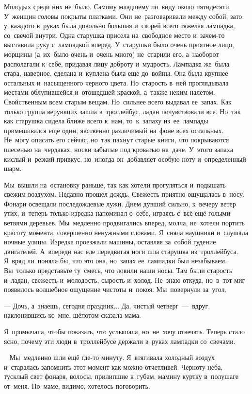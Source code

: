 Молодых среди них не~было.
Самому младшему по~виду около пятидесяти.
У~женщин головы покрыты платками.
Они не~разговаривали между собой, зато у~каждого в~руках была довольно большая и~скорей всего тяжелая лампадка, со~свечой внутри.
Одна старушка присела на~свободное место и~зачем-то выставила руку с~лампадкой вперед.
У~старушки было очень приятное лицо, морщины (а~их~было очень и~очень много) не~старили его, а~наоборот располагали к~себе, придавая лицу доброту и~мудрость.
Лампадка же~была стара, наверное, сделана и~куплена была еще до~войны.
Она была крупнее остальных и~насыщенного черного цвета.
Но~старость в~ней проглядывала местами облупившейся и~отошедшей краской, а~также неким налетом.
Свойственным всем старым вещам.
Но~сильнее всего выдавал ее~запах.
Как только группа верующих зашла в~троллейбус, ладан почувствовали все.
Но~так как старушка сидела ближе всего к~нам, то~к~запаху из~ее~лампады примешивался еще один, явственно различимый на~фоне всех остальных.
Не~могу описать его сейчас, но~так пахнут старые книги, что покрываются плесенью на~чердаках, носки забытые под кроватью на~даче.
У~этого запаха кислый и~резкий привкус, но~иногда он~добавляет особую ноту и~определенный шарм.


Мы~вышли на~остановку раньше, так как хотели прогуляться и~подышать свежим воздухом.
Недавно прошел дождь.
Свежесть приятно ощущалась в~носу.
Фонари освещали последождевые лужи.
Днем дувший сильно, к~вечеру ветер утих, и~теперь только изредка напоминал о~себе, играясь с~всё ещё голыми ветвями деревьев.
Мы~медленно продвигались вперед, молча, не~хотели портить красоту момента, совершенно ненужными словами.
Я~сняла наушники и~слушала ночные улицы.
Изредка проезжали машины, оставляя за~собой гудение двигателей.
А~впереди нас еле передвигая ноги шла старушка из~троллейбуса.
Я~вряд ли~поняла бы, что это она, но~запах ее~лампадки был незабываем.
Вы~только представьте ту~смесь, что ловили наши носы.
Там были старость и~ладан, свежесть и~молодость, сырость и~холод.
Не~знаю откуда, но~в~тот миг появилось волшебное ощущение чистоты и~покоя.
Мы~повернули за~угол.

 --- Дочь, а~знаешь, сегодня праздник... Да, чистый четверг~---~вдруг, наклонившись ко~мне, шёпотом сказала мама.

Я~промычала, чтобы показать, что услышала, но~не~хочу отвечать.
Теперь стало ясно, почему эти люди в~троллейбусе держали в~руках лампадки со~свечами.

~
Мы~медленно шли ещё где-то минуту.
Я~втягивала холодный воздух и~старалась запомнить этот момент как можно отчетливей.
Черноту неба, тусклый свет фонаря, волосы, прилипшие к~губам, мамину куртку в~полушаге от~меня.
Но~маме, видимо, хотелось поговорить.
 
